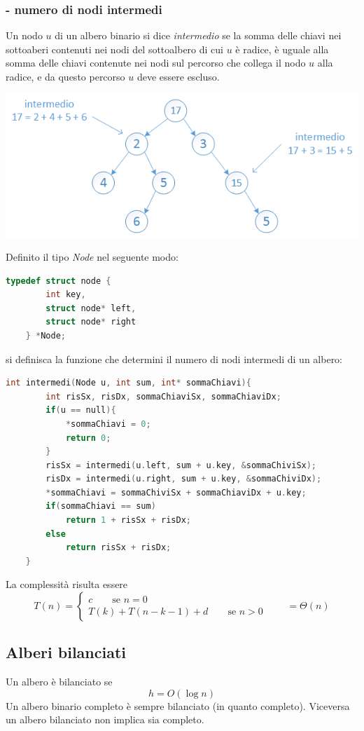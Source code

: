 \documentclass[italian]{article}
\newcommand{\exercize}{\text{\faPencil $\;$ Esercizio }}
\begin{document}
\subsubsection{\exercize - numero di nodi intermedi}
Un nodo $u$ di un albero binario si dice \textit{intermedio} se la somma delle chiavi nei sottoaberi contenuti nei nodi del sottoalbero di cui $u$ è radice, è uguale alla somma delle chiavi contenute nei nodi sul percorso che collega il nodo $u$ alla radice, e da questo percorso $u$ deve essere escluso.
\begin{center}
\includegraphics[width=0.7\linewidth]{images/nodi_intermedi}
\end{center}
Definito il tipo \textit{Node} nel seguente modo:
\begin{lstlisting}[language=c,mathescape=true]
	typedef struct node {
		int key,
		struct node* left,
		struct node* right
	} *Node;
\end{lstlisting}
si definisca la funzione che determini il numero di nodi intermedi di un albero:
\begin{lstlisting}[language=c,mathescape=true]
	int intermedi(Node u, int sum, int* sommaChiavi){
		int risSx, risDx, sommaChiaviSx, sommaChiaviDx;
		if(u == null){
			*sommaChiavi = 0;
			return 0;
		}
		risSx = intermedi(u.left, sum + u.key, &sommaChiviSx);
		risDx = intermedi(u.right, sum + u.key, &sommaChiviDx);
		*sommaChiavi = sommaChiviSx + sommaChiaviDx + u.key;
		if(sommaChiavi == sum)
			return 1 + risSx + risDx;
		else
			return risSx + risDx;
	}
\end{lstlisting}
La complessità risulta essere 
\[
	T(n) = 
	\begin{cases*}
		c \qquad\text{se } n=0 \\
		T(k) + T(n-k-1) + d \qquad\text{se } n>0 
	\end{cases*}
	\qquad = \varTheta(n)
\]
\pagebreak
\subsection{Alberi bilanciati}
Un albero è bilanciato se
\[
	h = O(\log n)
\]
Un albero binario completo è sempre bilanciato (in quanto completo). Viceversa un albero bilanciato non implica sia completo.
\end{document}
